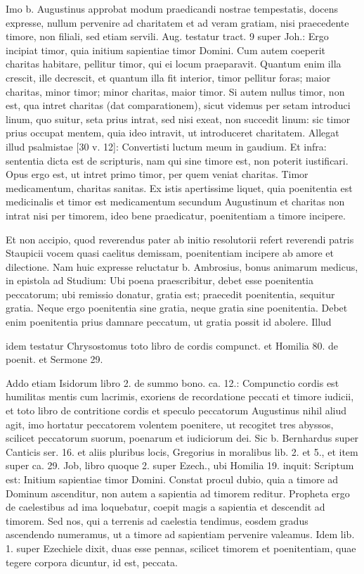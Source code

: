Imo b. Augustinus approbat modum praedicandi nostrae tempestatis, docens expresse, nullum pervenire ad charitatem et ad veram gratiam, nisi praecedente timore, non filiali, sed etiam servili. Aug. testatur tract. 9 super Joh.: Ergo incipiat timor, quia initium sapientiae timor Domini. Cum autem coeperit charitas habitare, pellitur timor, qui ei locum praeparavit. Quantum enim illa crescit, ille decrescit, et quantum illa fit interior, timor pellitur foras; maior charitas, minor timor; minor charitas, maior timor. Si autem nullus timor, non est, qua intret charitas (dat comparationem), sicut videmus per setam introduci linum, quo suitur, seta prius intrat, sed nisi exeat, non succedit linum: sic timor prius occupat mentem, quia ideo intravit, ut introduceret charitatem. Allegat illud psalmistae [30 v. 12]: Convertisti luctum meum in gaudium. Et infra: sententia dicta est de scripturis, nam qui sine timore est, non poterit iustificari. Opus ergo est, ut intret primo timor, per quem veniat charitas. Timor medicamentum, charitas sanitas. Ex istis apertissime liquet, quia poenitentia est medicinalis et timor est medicamentum secundum Augustinum et charitas non intrat nisi per timorem, ideo bene praedicatur, poenitentiam a timore incipere.

Et non accipio, quod reverendus pater ab initio resolutorii refert reverendi patris Staupicii vocem quasi caelitus demissam, poenitentiam incipere ab amore et dilectione. Nam huic expresse reluctatur b. Ambrosius, bonus animarum medicus, in epistola ad Studium: Ubi poena praescribitur, debet esse poenitentia peccatorum; ubi remissio donatur, gratia est; praecedit poenitentia, sequitur gratia. Neque ergo poenitentia sine gratia, neque gratia sine poenitentia. Debet enim poenitentia prius damnare peccatum, ut gratia possit id abolere. Illud

idem testatur Chrysostomus toto libro de cordis compunct. et Homilia 80. de poenit. et Sermone 29.

Addo etiam Isidorum libro 2. de summo bono. ca. 12.: Compunctio cordis est humilitas mentis cum lacrimis, exoriens de recordatione peccati et timore iudicii, et toto libro de contritione cordis et speculo peccatorum Augustinus nihil aliud agit, imo hortatur peccatorem volentem poenitere, ut recogitet tres abyssos, scilicet peccatorum suorum, poenarum et iudiciorum dei. Sic b. Bernhardus super Canticis ser. 16. et aliis pluribus locis, Gregorius in moralibus lib. 2. et 5., et item super ca. 29. Job, libro quoque 2. super Ezech., ubi Homilia 19. inquit: Scriptum est: Initium sapientiae timor Domini. Constat procul dubio, quia a timore ad Dominum ascenditur, non autem a sapientia ad timorem reditur. Propheta ergo de caelestibus ad ima loquebatur, coepit magis a sapientia et descendit ad timorem. Sed nos, qui a terrenis ad caelestia tendimus, eosdem \marginpar{\small[361]} gradus ascendendo numeramus, ut a timore ad sapientiam pervenire valeamus. Idem lib. 1. super Ezechiele dixit, duas esse pennas, scilicet timorem et poenitentiam, quae tegere corpora dicuntur, id est, peccata.

